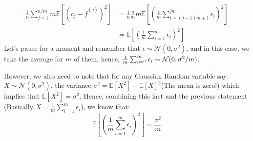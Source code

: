 \documentclass[]{article}
\begin{document}
		\begin{align*}\tag{B.1.c.3}\label{eqn:B.1.c.3}
			\frac{1}{n}\sum_{j = 1}^{n/m}
			m\mathbb{E}\left[
				(c_j - \bar{f}^{(j)})^2
			\right]
			&=
			\frac{1}{n}\frac{n}{m}m \mathbb{E}\left[
				\left(
					\frac{1}{m}\sum_{i = (j - 1)m + 1}^{jm}\epsilon_i
				\right)^2
			\right]
			\\
			&= \mathbb{E}\left[
				\left(
					\frac{1}{m}\sum_{i = 1}^{m}\epsilon_i
				\right)^2
			\right]
		\end{align*}
		Let's pause for a moment and remember that $\epsilon \sim \mathcal{N}(0, \sigma^2)$, and in this case, we take the average for $m$ of them, hence, $\frac{1}{m}\sum_{i = `'}^{m}\epsilon_i\sim \mathcal{N}(0, \sigma^2/m)$. 
		\par
		However, we also need to note that for any Gaussian Random variable say: $X\sim \mathcal{N}(0, \sigma^2)$, the variance $\sigma^2 = \mathbb{E}\left[X^2\right] - \mathbb{E}\left[X\right]^2$(The mean is zero!) which implies that $\mathbb{E}\left[X^2\right] = \sigma^2$. Hence, combining this fact and the previous statement (Basically $X = \frac{1}{m}\sum_{i = 1}^{m}\epsilon_i$), we know that: 
		\begin{equation*}\tag{B.1.c.4}\label{eqn:B.1.c.4}
			\mathbb{E}\left[
				\left(
					\frac{1}{m}\sum_{i = 1}^{m}\epsilon_i
				\right)^2
			\right] = \frac{\sigma^2}{m}
		\end{equation*}
\end{document}
